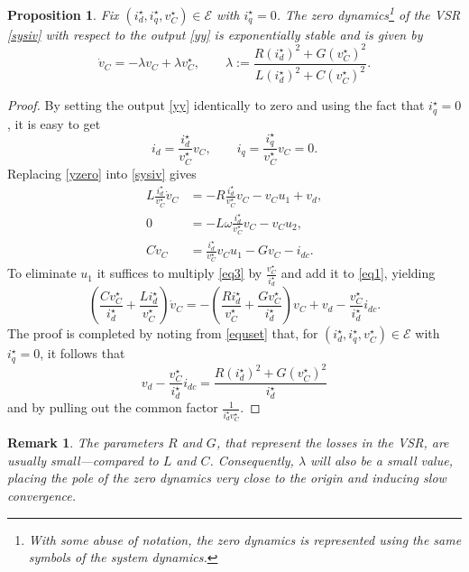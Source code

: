 \documentclass[5p,twocolumn]{elsarticle}
\def\lab{\label}
\def\begrem{\begin{remark}\rm}
\def\endrem{\end{remark}}
\newtheorem{proposition}[theorem]{Proposition}
\newtheorem{remark}[theorem]{Remark}
\numberwithin{equation}{section}
\begin{document}
\begin{proposition}\em
\label{zeroprop}
Fix $(i^\star _{d},i^\star _{q},v^\star _{C}) \in {\mathcal{E}}$ with $i_q^\star =0$. The zero dynamics\footnote{With some abuse of notation, the zero dynamics is represented using the same symbols of the system
dynamics.} of the VSR \eqref{sysiv} with respect to the output \eqref{yy} is {\em exponentially stable} and is given by
\begin{equation}
\lab{zerdynpipbc}
\dot v_C=-\lambda v_C+\lambda v_C^\star ,\qquad \lambda:=\frac{R(i_d^\star )^2+G(v_C^\star )^2}{L(i_d^\star )^2+C(v_C^\star )^2}.
\end{equation}
\end{proposition}
\begin{proof}
By setting the output \eqref{yy} identically to zero and using  the fact that $i_q^\star=0$,  it is easy to get
\begin{equation}\label{yzero}
i_d=\frac{i^\star _d}{v_C^\star }v_C,\qquad i_q=\frac{i^\star _q}{v_C^\star }v_C=0.
\end{equation}
Replacing \eqref{yzero} into \eqref{sysiv} gives
\begin{align}
L\frac{i_d^\star }{v_C^\star }\dot v_C&=-R\frac{i_d^\star }{v_C^\star }v_C-v_C u_1 +v_d,\label{eq1}\\
0&=-L\omega\frac{i_d^\star }{v_C^\star }v_C-v_C u_2,\label{eq2}\\
C\dot v_C&=\frac{i_d^\star }{v_C^\star }v_C u_1 -Gv_C-i_{dc}.\label{eq3}
\end{align}
To eliminate $u_1$ it suffices to multiply \eqref{eq3} by $\frac{v_C^\star }{i_d^\star }$ and add it to  \eqref{eq1}, yielding
$$ 
\left(\frac{Cv_C^\star }{i_d^\star }+ \frac{L i_d^\star }{v_C^\star }\right)\dot v_C=-\left(\frac{Ri_d^\star }{v_C^\star }+ \frac{Gv_C^\star }{i_d^\star }\right)v_C+v_d-\frac{v_C^\star }{i_d^\star }i_{dc}. 
$$
The proof is completed by noting from \eqref{equset} that, for $(i^\star _{d},i^\star _{q},v^\star _{C}) \in {\mathcal{E}}$ with $i_q^\star =0$, it follows that
$$
v_d-\frac{v_C^\star }{i_d^\star }i_{dc}=\frac{R(i_d^\star )^2+G(v_C^\star )^2}{i_d^\star}
$$
and by pulling out the common factor $\frac{1 }{i_d^\star v_C^\star }$.
\end{proof}

\begrem
The parameters $R$ and $G$, that represent the losses in the VSR, are usually small---compared to $L$ and $C$. Consequently, $\lambda$ will also be a small value, placing the pole of the zero dynamics
very close to the origin and inducing slow convergence.
\endrem
\end{document}
